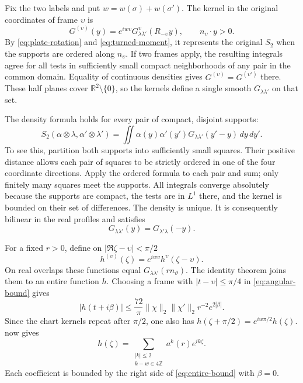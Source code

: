 \documentclass[11pt,letterpaper,reqno]{amsart}
\theoremstyle{definition}
\theoremstyle{remark}
\newcommand{\R}{\mathbb R}\newcommand{\C}{\mathbb C}
\newcommand{\Z}{\mathbb Z}\newcommand{\B}{\mathbb B}
\begin{document}
Fix the two labels and put $w=w(\sigma)+w(\sigma')$.
The kernel in the original coordinates of frame $\upsilon$ is
\[
 G^{(\upsilon)}(y)=e^{iw\upsilon}
     G^\upsilon_{\lambda\lambda'}(R_{-\upsilon}y),
 \qquad n_\upsilon\cdot y>0.
\]
By \eqref{eq:plate-rotation} and \eqref{eq:turned-moment}, it
represents the original $S_2$ when the supports are ordered along
$n_\upsilon$. If two frames apply, the resulting integrals agree for
all tests in sufficiently small compact neighborhoods of any pair
in the common domain. Equality of continuous densities gives
$G^{(\upsilon)}=G^{(\upsilon')}$ there. These half planes cover
$\R^2\setminus\{0\}$, so the kernels define a single smooth
$G_{\lambda\lambda'}$ on that set.

The density formula holds for every pair of compact, disjoint supports:
\begin{equation}\label{eq:global-density}
 S_2(\alpha\otimes\lambda,\alpha'\otimes\lambda')
 =\iint\alpha(y)\alpha'(y')G_{\lambda\lambda'}(y'-y)\,dy\,dy'.
\end{equation}
To see this, partition both supports into sufficiently small squares.
Their positive distance allows each pair of squares to be strictly
ordered in one of the four coordinate directions. Apply the ordered
formula to each pair and sum; only finitely many squares meet the
supports. All integrals converge absolutely because the supports are
compact, the tests are in $L^1$ there, and the kernel is bounded on
their set of differences. The density is unique. It is consequently
bilinear in the real profiles and satisfies
\begin{equation}\label{eq:kernel-symmetry}
 G_{\lambda\lambda'}(y)=G_{\lambda'\lambda}(-y).
\end{equation}

For a fixed $r>0$, define on $|\Re\zeta-\upsilon|<\pi/2$
\[
 h^{(\upsilon)}(\zeta)=e^{iw\upsilon}h^\upsilon(\zeta-\upsilon).
\]
On real overlaps these functions equal
$G_{\lambda\lambda'}(rn_\vartheta)$. The identity theorem joins them
to an entire function $h$. Choosing a frame with
$|t-\upsilon|\le\pi/4$ in \eqref{eq:angular-bound} gives
\begin{equation}\label{eq:entire-bound}
 |h(t+i\beta)|\le\frac{72}{\pi}\|\chi\|_2\|\chi'\|_2
       r^{-2}e^{2|\beta|}.
\end{equation}
Since the chart kernels repeat after $\pi/2$, one also has
$h(\zeta+\pi/2)=e^{iw\pi/2}h(\zeta)$.  now gives
\begin{equation}\label{eq:two-frequencies}
 h(\zeta)=\sum_{\substack{|k|\le2\\ k-w\in4\Z}}a^k(r)e^{ik\zeta}.
\end{equation}
Each coefficient is bounded by the right side of
\eqref{eq:entire-bound} with $\beta=0$.
\end{document}
